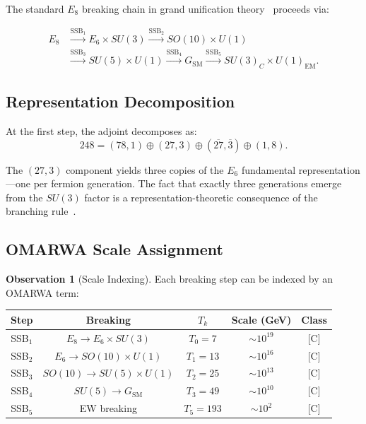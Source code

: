 \documentclass[11pt, a4paper]{article}
\theoremstyle{plain}
\theoremstyle{definition}
\newtheorem{observation}{Observation}[section]
\theoremstyle{remark}
\begin{document}
The standard $E_8$ breaking chain in grand unification
theory~\cite{slansky,georgi,gursey} proceeds via:

\begin{equation}
\label{eq:chain}
\begin{split}
E_8 &\xrightarrow{\text{SSB}_1}
E_6 \times SU(3) \xrightarrow{\text{SSB}_2}
SO(10) \times U(1) \\
&\xrightarrow{\text{SSB}_3}
SU(5) \times U(1) \xrightarrow{\text{SSB}_4}
G_{\mathrm{SM}} \xrightarrow{\text{SSB}_5}
SU(3)_C \times U(1)_{\mathrm{EM}}.
\end{split}
\end{equation}

\subsection{Representation Decomposition}

At the first step, the adjoint decomposes as:
\begin{equation}
248 = (78, 1) \oplus (27, 3) \oplus (\overline{27}, \overline{3})
\oplus (1, 8).
\end{equation}

The $(27, 3)$ component yields three copies of the $E_6$
fundamental representation---one per fermion generation. The fact
that exactly three generations emerge from the $SU(3)$ factor is
a representation-theoretic consequence of the branching
rule~\cite{gursey,slansky}.

\subsection{OMARWA Scale Assignment}

\begin{observation}[Scale Indexing]
\label{obs:scale}
Each breaking step can be indexed by an OMARWA term:

\smallskip
\begin{center}
\begin{tabular}{@{}ccccc@{}}
\toprule
Step & Breaking & $T_k$ & Scale (GeV) & Class \\
\midrule
SSB$_1$ & $E_8 \to E_6 \times SU(3)$ & $T_0 = 7$ & $\sim 10^{19}$ & [C] \\
SSB$_2$ & $E_6 \to SO(10) \times U(1)$ & $T_1 = 13$ & $\sim 10^{16}$ & [C] \\
SSB$_3$ & $SO(10) \to SU(5) \times U(1)$ & $T_2 = 25$ & $\sim 10^{13}$ & [C] \\
SSB$_4$ & $SU(5) \to G_{\mathrm{SM}}$ & $T_3 = 49$ & $\sim 10^{10}$ & [C] \\
SSB$_5$ & EW breaking & $T_5 = 193$ & $\sim 10^{2}$ & [C] \\
\bottomrule
\end{tabular}
\end{center}
\end{observation}
\end{document}

